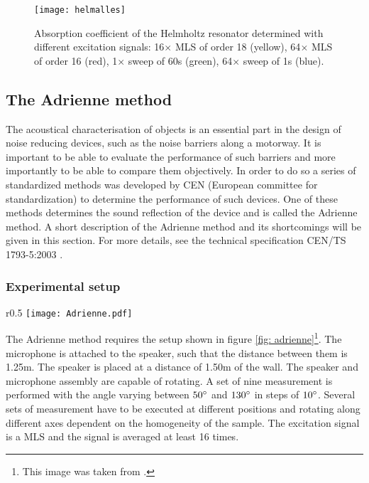 \begin{figure}[h!]
  \centering
    \texttt{[image: helmalles]}
  \caption{Absorption coefficient of the Helmholtz resonator determined with different excitation signals: 16$\times$ MLS of order 18 (yellow), 64$\times$ MLS of order 16 (red), 1$\times$ sweep of 60s (green), 64$\times$ sweep of 1s (blue).}
  \label{fig: helmholtzalles}
\end{figure}


\subsection{The Adrienne method}
The acoustical characterisation of objects is an essential part in the design of noise reducing devices, such as the noise barriers along a motorway. It is important to be able to evaluate the performance of such barriers and more importantly to be able to compare them objectively. In order to do so a series of standardized methods was developed by CEN (European committee for standardization) to determine the performance of such devices. One of these methods determines the sound reflection of the device and is called the Adrienne method. A short description of the Adrienne method and its shortcomings will be given in this section. For more details, see the technical specification CEN/TS 1793-5:2003 \cite{Adrienne}.



\subsubsection{Experimental setup}

\begin{wrapfigure}{r}{0.5\textwidth}
	\vspace{-10pt}
  \centering
    \texttt{[image: Adrienne.pdf]}
  \caption{Setup for the reflection index measurements according to the Adrienne method.}
  \label{fig: adrienne}
  \vspace{-40pt}
\end{wrapfigure}
The Adrienne method requires the setup shown in figure \ref{fig: adrienne}\footnote{This image was taken from \cite[p.45]{Geetere}.}. The microphone is attached to the speaker, such that the distance between them is 1.25m. The speaker is placed at a distance of 1.50m of the wall. The speaker and microphone assembly are capable of rotating. A set of nine measurement is performed with the angle varying between $50^\circ$ and $130^\circ$ in steps of $10^\circ$.  Several sets of measurement have to be executed at different positions and rotating along different axes dependent on the homogeneity of the sample.
The excitation signal is a MLS and the signal is averaged at least 16 times.


